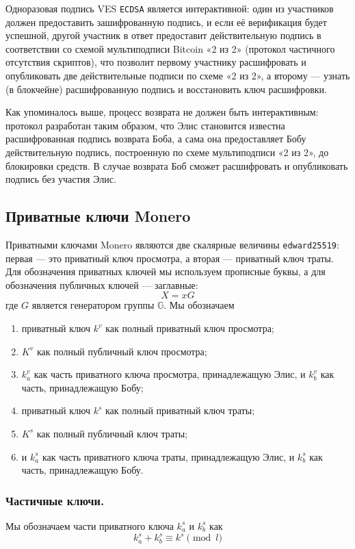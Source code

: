 \documentclass{llncs}
\newcommand{\GG}{\mathbb{G}}
\begin{document}
Одноразовая подпись VES \texttt{ECDSA} является интерактивной: один из участников должен предоставить зашифрованную подпись, и если её верификация будет успешной, другой участник в ответ предоставит действительную подпись в соответствии со схемой мультиподписи Bitcoin «2 из 2» (протокол частичного отсутствия скриптов), что позволит первому участнику расшифровать и опубликовать две действительные подписи по схеме «2 из 2», а второму — узнать (в блокчейне) расшифрованную подпись и восстановить ключ расшифровки.

Как упоминалось выше, процесс возврата не должен быть интерактивным: протокол разработан таким образом, что Элис становится известна расшифрованная подпись возврата Боба, а сама она предоставляет Бобу действительную подпись, построенную по схеме мультиподписи «2 из 2», до блокировки средств. В случае возврата Боб сможет расшифровать и опубликовать подпись без участия Элис.

\subsection{Приватные ключи Monero}
Приватными ключами Monero являются две скалярные величины \texttt{edward25519}: первая — это приватный ключ просмотра, а вторая — приватный ключ траты. Для обозначения приватных ключей мы используем прописные буквы, а для обозначения публичных ключей — заглавные:
$$X = xG$$
где $G$ является генератором группы $\GG$. Мы обозначаем
\begin{enumerate}[label=(\roman*)]
    \item приватный ключ $k^v$ как полный приватный ключ просмотра;
    \item $K^v$ как полный публичный ключ просмотра;
    \item $k^v_a$ как часть приватного ключа просмотра, принадлежащую Элис, и $k^v_b$ как часть, принадлежащую Бобу;
    \item приватный ключ $k^s$ как полный приватный ключ траты;
    \item $K^s$ как полный публичный ключ траты;
    \item и $k^s_a$ как часть  приватного ключа траты, принадлежащую Элис, и $k^s_b$ как часть, принадлежащую Бобу.
\end{enumerate}

\subsubsection{Частичные ключи.}
Мы обозначаем части приватного ключа $k^s_a$ и $k^s_b$ как
$$k^s_a + k^s_b \equiv k^s \pmod l$$
\end{document}
